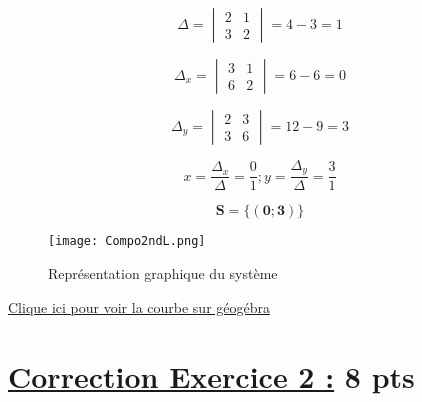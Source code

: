 \documentclass[12pt,a4paper]{article}
\begin{document}
\begin{enumerate}
\[
\Delta = 
\begin{vmatrix}
2 & 1 \\
3 & 2
\end{vmatrix}
=4-3=1
\]

\[
\Delta_x = 
\begin{vmatrix}
3 & 1 \\
6 & 2
\end{vmatrix}
=6-6=0
\]

\[
\Delta_y = 
\begin{vmatrix}
2 & 3 \\
3 & 6
\end{vmatrix}
=12-9=3
\]

\[x=\frac{\Delta_x}{\Delta} = \frac{0}{1} ; y=\frac{\Delta_y}{\Delta} = \frac{3}{1}\]

    \begin{resultbox}
    \[
    \mathbf{S =\{(0;3)\}}
    \]
		\end{resultbox}
\begin{center}
\begin{figure}[H]%
\centering
\texttt{[image: Compo2ndL.png]}
\caption{Représentation graphique du système}
\label{fig:monimage}
\end{figure}
\href{https://www.geogebra.org/classic/ebh2sxnk}{Clique ici pour voir la courbe sur géogébra}\\
\end{center}
\end{enumerate}

\section*{\underline{Correction Exercice 2 :} 8 pts}
\end{document}
